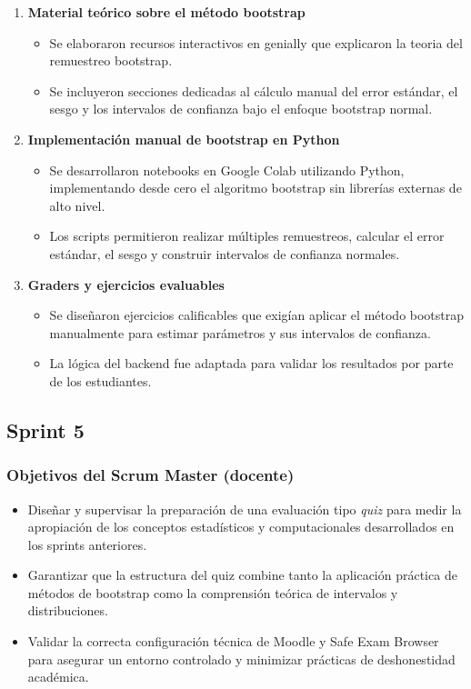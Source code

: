 \documentclass[letter,oneside,12pt,spanish]{report}
\begin{document}
\begin{enumerate}
	\item \textbf{Material teórico sobre el método bootstrap}  
	\begin{itemize}
		\item Se elaboraron recursos interactivos en genially que explicaron la teoria del remuestreo bootstrap.
		\item Se incluyeron secciones dedicadas al cálculo manual del error estándar, el sesgo y los intervalos de confianza bajo el enfoque bootstrap normal.
	\end{itemize}
	
	\item \textbf{Implementación manual de bootstrap en Python}  
	\begin{itemize}
		\item Se desarrollaron notebooks en Google Colab utilizando Python, implementando desde cero el algoritmo bootstrap sin librerías externas de alto nivel.
		\item Los scripts permitieron realizar múltiples remuestreos, calcular el error estándar, el sesgo y construir intervalos de confianza normales.
	\end{itemize}
	
	\item \textbf{Graders y ejercicios evaluables}  
	\begin{itemize}
		\item Se diseñaron ejercicios calificables que exigían aplicar el método bootstrap manualmente para estimar parámetros y sus intervalos de confianza.
		\item La lógica del backend fue adaptada para validar los resultados por parte de los estudiantes.
	\end{itemize}
	
\end{enumerate}

\subsection{Sprint 5}

\subsubsection*{Objetivos del Scrum Master (docente)}
\begin{itemize}
	\item Diseñar y supervisar la preparación de una evaluación tipo \textit{quiz} para medir la apropiación de los conceptos estadísticos y computacionales desarrollados en los sprints anteriores.
	\item Garantizar que la estructura del quiz combine tanto la aplicación práctica de métodos de bootstrap como la comprensión teórica de intervalos y distribuciones.
	\item Validar la correcta configuración técnica de Moodle y Safe Exam Browser para asegurar un entorno controlado y minimizar prácticas de deshonestidad académica.
\end{itemize}
\end{document}

